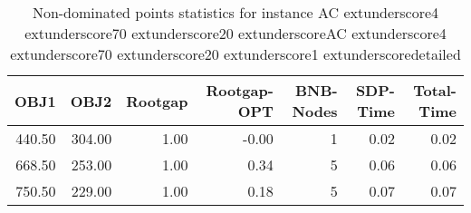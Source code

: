 \begin{table}
\caption{Non-dominated points statistics for instance AC	extunderscore4	extunderscore70	extunderscore20	extunderscoreAC	extunderscore4	extunderscore70	extunderscore20	extunderscore1	extunderscoredetailed}
\label{tab:stats/AC_4_70_20_AC_4_70_20_1_detailed}
\begin{tabular}{rrrrrrr}
\toprule
OBJ1 & OBJ2 & Rootgap & Rootgap-OPT & BNB-Nodes & SDP-Time & Total-Time \\
\midrule
440.50 & 304.00 & 1.00 & -0.00 & 1 & 0.02 & 0.02 \\
668.50 & 253.00 & 1.00 & 0.34 & 5 & 0.06 & 0.06 \\
750.50 & 229.00 & 1.00 & 0.18 & 5 & 0.07 & 0.07 \\
\bottomrule
\end{tabular}
\end{table}

